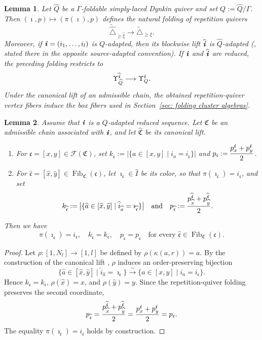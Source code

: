 \documentclass[12pt, leqno]{amsart}
\numberwithin{equation}{section}
\theoremstyle{plain}
\newtheorem{lemma}{Lemma}[section]
\theoremstyle{definition}
\newcommand{\seteq}{\mathbin{:=}}
\newcommand{\Dynkin}{\triangle}
\newcommand{\im}{\imath}
\newcommand{\ii}{ \textbf{\textit{i}}}
\newcommand{\Fib}{\operatorname{Fib}}
\newcommand{\hI}{\widehat{I}}
\newcommand{\hQ}{\widehat{Q}}
\newcommand{\ha}{\widehat{a}}
\newcommand{\hi}{\widehat{i}}
\newcommand{\hx}{\widehat{x}}
\newcommand{\hy}{\widehat{y}}
\newcommand{\hii}{{\widehat{\ii}}}
\newcommand{\frakC}{\mathfrak{C}}
\newcommand{\frakc}{\mathfrak{c}}
\newcommand{\hfrakC}{\widehat{\frakC}}
\newcommand{\hfrakc}{\widehat{\frakc}}
\newcommand{\calF}{\mathcal{F}}
\newcommand{\hDynkin}{{\widehat{\Dynkin}}}
\newcommand{\tDynkin}{{\widetilde{\Dynkin}}}
\newcommand{\qtq}[1][{and}]{\quad\text{{#1}}\quad}
\newcommand{\ee}{\end{enumerate}}
\newcommand{\bnum}{\begin{enumerate}[{\rm (i)}]}
\begin{document}
\begin{lemma}\label{lem: folding of adapted repetition quivers}
Let \(\hQ\) be a \(\Gamma\)-foldable simply-laced Dynkin quiver and set
$Q\seteq\hQ/\Gamma.$
Then $(\im,p)\longmapsto(\pi(\im),p)$
defines the natural folding of repetition quivers
\[
\widetilde{\hDynkin}_{\geq\widehat\xi} \longrightarrow \tDynkin_{\geq\xi}.
\]
Moreover, if $\ii=(i_1,\ldots,i_l)$
is \(Q\)-adapted, then its blockwise lift
$\hii$ is \(\hQ\)-adapted
(\cite[Lemma~8.1]{JO26}, stated there in the opposite source-adapted convention).  If \(\ii\) and \(\hii\) are reduced, the
preceding folding restricts to
\[
\Upsilon_{\hQ}^{\hii} \longrightarrow \Upsilon_Q^\ii.
\]
Under the canonical lift of an admissible chain, the obtained
repetition-quiver vertex fibers induce the box fibers used in
Section~\ref{sec: folding cluster algebras}.
\end{lemma}



\begin{lemma}\label{lem: folding preserves KR box parameters}
Assume that \(\ii\) is a \(Q\)-adapted reduced sequence.  Let
\(\frakC\) be an admissible chain associated with \(\ii\), and let
\(\hfrakC\) be its canonical lift.
\bnum
\item For $\frakc=[x,y]\in\calF(\frakC)$, set 
$k_\frakc \seteq \bigl| \{a\in[x,y]\mid i_a=i_\frakc\} \bigr|$ and $p_\frakc \seteq \dfrac{p_x^\ii+p_y^\ii}{2}$.
\item For $\hfrakc=[\hx,\hy] \in\Fib_{\frakC}(\frakc)$,
let $\im_{\hfrakc}\in\hI$ be its color, so that
$\pi(\im_{\hfrakc})=i_\frakc$, and set
\[k_{\hfrakc} \seteq \bigl| \{ \ha\in[\hx,\hy] \mid \hi_{\ha}=\im_{\hfrakc} \} \bigr| \qtq
p_{\hfrakc} \seteq \frac{ p_{\hx}^{\hii} + p_{\hy}^{\hii} }{2}.
\] 
\ee 
Then we have 
\[
\pi(\im_{\hfrakc})=i_\frakc, \quad k_{\hfrakc}=k_\frakc, \quad p_{\hfrakc}=p_\frakc  \quad \text{for every $\hfrakc\in\Fib_{\frakC}(\frakc)$.}
\]
\end{lemma}

\begin{proof}
Let \(\rho:[1,N_l]\longrightarrow[1,l]\) be defined by
\(\rho(\kappa(a,r))=a\).
By the construction of the canonical lift
\cite[Lemma~3.13]{JO26}, \(\rho\) induces an
order-preserving bijection
\[
\{\ha\in[\hx,\hy]\mid\hi_{\ha}=\im_{\hfrakc}\}
\xrightarrow{\sim}
\{a\in[x,y]\mid i_a=i_\frakc\}.
\]
Hence \(k_{\hfrakc}=k_\frakc\),
\(\rho(\hx)=x\), and \(\rho(\hy)=y\).
Since the repetition-quiver folding preserves the second
coordinate,
\[
p_{\hfrakc}
=\frac{p_{\hx}^{\hii}+p_{\hy}^{\hii}}2
=\frac{p_x^\ii+p_y^\ii}2
=p_\frakc.
\]
The equality \(\pi(\im_{\hfrakc})=i_\frakc\) holds by construction.
\end{proof}
\end{document}
